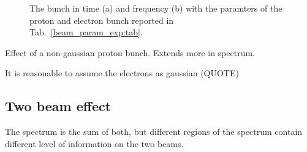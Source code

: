 \begin{figure}[ht]
\centering
{}
\hspace{3mm}
\caption{The bunch in time (a) and frequency (b) with the paramters of the proton and electron bunch reported in Tab.~\ref{beam_param_exp:tab}.}
\label{gauss_bunch}
\end{figure}

Effect of a non-gaussian proton bunch. Extends more in spectrum.

It is reasonable to assume the electrons as gaussian (QUOTE)


\subsection[Two beam effect]{Two beam effect}

The spectrum is the sum of both, but different regions of the spectrum contain different level of information on the two beams.
